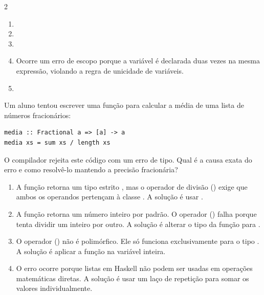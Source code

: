 \documentclass[a4paper,10pt,brazil]{article}
\begin{document}
\begin{multicols}{2}
\begin{enumerate}
  \item {}

  \item {}

  \item {}

  \item Ocorre um erro de escopo porque a variável  é declarada duas vezes na mesma expressão, violando a regra de unicidade de variáveis.

  \item {}


\end{enumerate}

Um aluno tentou escrever uma função para calcular a média de uma lista de números fracionários:
\begin{verbatim}
media :: Fractional a => [a] -> a
media xs = sum xs / length xs
\end{verbatim}
O compilador rejeita este código com um erro de tipo. Qual é a causa exata do erro e como resolvê-lo mantendo a precisão fracionária?

\begin{enumerate}
  \item A função  retorna um tipo estrito , mas o operador de divisão (\haskellinline{/}) exige que ambos os operandos pertençam à classe . A solução é usar .

  \item A função  retorna um número inteiro por padrão. O operador (\haskellinline{/}) falha porque tenta dividir um inteiro por outro. A solução é alterar o tipo da função para .

  \item O operador (\haskellinline{/}) não é polimórfico. Ele só funciona exclusivamente para o tipo . A solução é aplicar a função  na variável  inteira.

  \item O erro ocorre porque listas em Haskell não podem ser usadas em operações matemáticas diretas. A solução é usar um laço de repetição  para somar os valores individualmente.


\end{enumerate}
\end{multicols}
\end{document}
